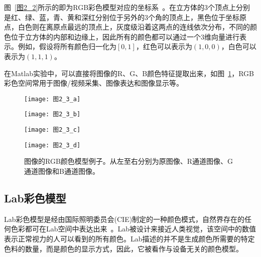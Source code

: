 图~\ref{图2_2}所示的即为RGB彩色模型对应的坐标系~\cite{ZhangZheng2010book}。在立方体的3个顶点上分别是红、绿、蓝，青、黄和深红分别位于另外的3个角的顶点上，黑色位于坐标原点，白色则在离原点最远的顶点上，灰度级沿着这两点的连线依次分布，不同的颜色位于立方体的内部和边缘上，因此所有的颜色都可以通过一个3维向量进行表示。例如，假设将所有颜色归一化为$[0,1]$，红色可以表示为$(1,0,0)$，白色可以表示为$(1,1,1)$。

在Matlab实验中，可以直接将图像的R、G、B颜色特征提取出来，如图~\ref{图2_3}，RGB彩色空间常用于图像/视频采集、图像表达和图像显示等。

\begin{figure}[b]
\begin{minipage}{0.24\textwidth}
  \centering
  \texttt{[image: 图2\_3\_a]}
  \label{图2_3_a}
\end{minipage}\hfill
\begin{minipage}{0.24\textwidth}
  \centering
  \texttt{[image: 图2\_3\_b]}
  \label{图2_3_b}
\end{minipage}
\begin{minipage}{0.24\textwidth}
  \centering
  \texttt{[image: 图2\_3\_c]}
  \label{图2_3_c}
\end{minipage}
\begin{minipage}{0.24\textwidth}
  \centering
  \texttt{[image: 图2\_3\_d]}
  \label{图2_3_d}
\end{minipage}
  \caption{图像的RGB颜色模型例子。从左至右分别为原图像、R通道图像、G通道图像和B通道图像。}
  \label{图2_3} 
\end{figure}

\subsection{Lab彩色模型}
\label{2_1_2}

Lab彩色模型是经由国际照明委员会(CIE)制定的一种颜色模式，自然界存在的任何色彩都可在Lab空间中表达出来~\cite{ZhangZheng2010book}。Lab被设计来接近人类视觉，该空间中的数值表示正常视力的人可以看到的所有颜色。Lab描述的并不是生成颜色所需要的特定色料的数量，而是颜色的显示方式，因此，它被看作与设备无关的颜色模型。

